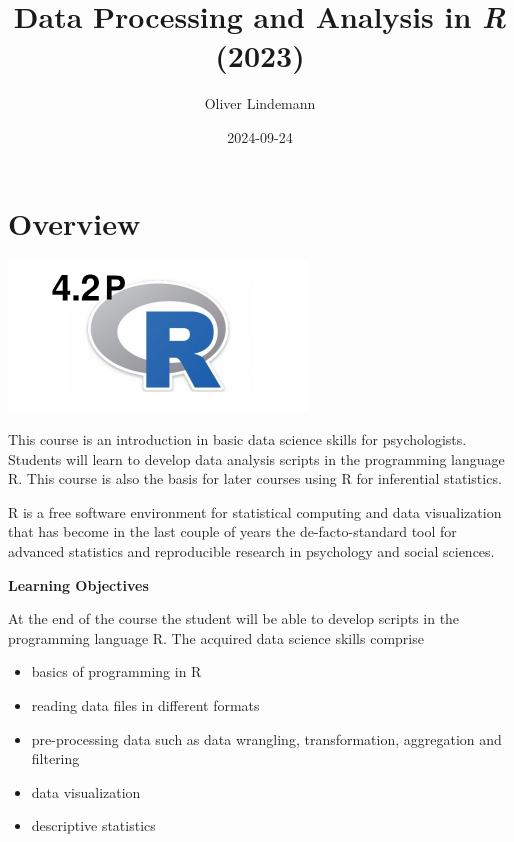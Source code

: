 \documentclass[
]{scrartcl}
\title{Data Processing and Analysis in \emph{R} (2023)}
\author{Oliver Lindemann}
\date{2024-09-24}
\providecommand{\tightlist}{%
  \setlength{\itemsep}{0pt}\setlength{\parskip}{0pt}}
\begin{document}
\maketitle

{
\hypersetup{linkcolor=}
\setcounter{tocdepth}{2}
\tableofcontents
}
\newpage

\hypertarget{overview}{%
\section*{Overview}\label{overview}}

\begin{center}\includegraphics[width=300px]{images/R-course-logo} \end{center}

This course is an introduction in basic data science skills for psychologists. Students will learn to develop data analysis scripts in the programming language R. This course is also the basis for later courses using R for inferential statistics.

R is a free software environment for statistical computing and data visualization that has become in the last couple of years the de-facto-standard tool for advanced statistics and reproducible research in psychology and social sciences.

\textbf{Learning Objectives}

At the end of the course the student will be able to develop scripts in the programming language R. The acquired data science skills comprise

\begin{itemize}
\tightlist
\item
  basics of programming in R
\item
  reading data files in different formats
\item
  pre-processing data such as data wrangling, transformation, aggregation and filtering
\item
  data visualization
\item
  descriptive statistics
\end{itemize}
\end{document}
